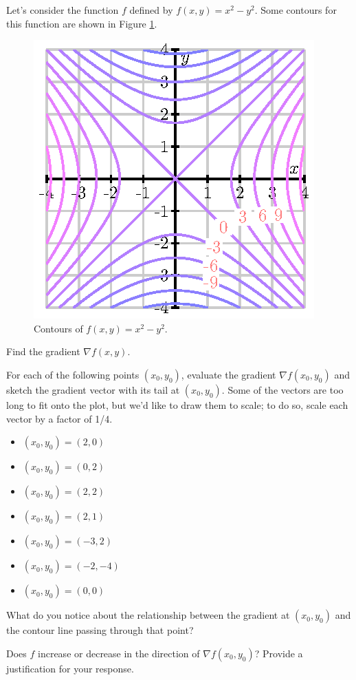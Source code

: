 \begin{activity} \label{A:10.6.10} 
  Let's consider the function $f$ defined  by $f(x,y) = x^2 - y^2$.  Some contours for this function are shown in Figure
  \ref{F:10.6.activity.1}. 

  \begin{figure}[ht]
    \begin{center}
      \includegraphics{figures/fig_10_6_contours_1.eps}
    \end{center}	
    \caption{Contours of $f(x,y) = x^2 - y^2$. }
    \label{F:10.6.activity.1}
  \end{figure}
  \ba
  \item Find the gradient $\nabla f (x,y)$.
  \item For each of the following points $(x_0,y_0)$, evaluate the gradient $\nabla f(x_0,y_0)$ and sketch the gradient vector with its tail at
    $(x_0,y_0)$.  Some of the vectors are too long
    to fit onto the plot, but we'd like to draw them to scale;  to do so, scale each vector by a factor of 1/4.
    \begin{itemize}
      \item $(x_0,y_0) = (2,0)$
      \item $(x_0,y_0) = (0,2)$
      \item $(x_0,y_0) = (2,2)$
      \item $(x_0,y_0) = (2,1)$
      \item $(x_0,y_0) = (-3,2)$
      \item $(x_0,y_0) = (-2,-4)$
      \item $(x_0,y_0) = (0,0)$
    \end{itemize}
  \item What do you notice about the relationship between the gradient at
    $(x_0,y_0)$ and the contour line passing through that point?
  \item Does $f$ increase or decrease in the direction of $\nabla
    f(x_0,y_0)$?  Provide a justification for your response.

    \ea

\end{activity}

